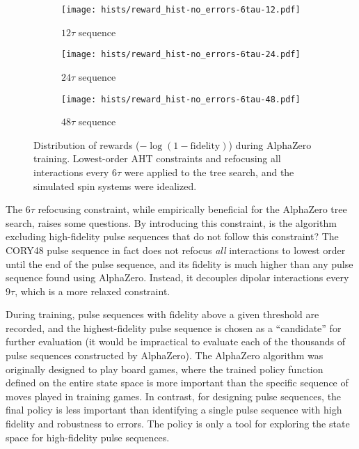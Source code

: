 \begin{figure}[H]
    \centering
    \begin{subfigure}{.49\textwidth}
        \centering
        \texttt{[image: hists/reward\_hist-no\_errors-6tau-12.pdf]}
        \caption{$12\tau$ sequence}
        \label{fig:reward_hist-no_errors-6tau-12}
    \end{subfigure}
    \begin{subfigure}{.49\textwidth}
        \centering
        \texttt{[image: hists/reward\_hist-no\_errors-6tau-24.pdf]}
        \caption{$24\tau$ sequence}
        \label{fig:reward_hist-no_errors-6tau-24}
    \end{subfigure}
    \begin{subfigure}{.49\textwidth}
        \centering
        \texttt{[image: hists/reward\_hist-no\_errors-6tau-48.pdf]}
        \caption{$48\tau$ sequence}
        \label{fig:reward_hist-no_errors-6tau-48}
    \end{subfigure}
    \caption{Distribution of rewards ($-\log(1 - \text{fidelity})$) during AlphaZero training. Lowest-order AHT constraints and refocusing all interactions every $6\tau$ were applied to the tree search, and the simulated spin systems were idealized.}
    \label{fig:reward_hist-no_errors-6tau}
\end{figure}

The $6\tau$ refocusing constraint, while empirically beneficial for the AlphaZero tree search, raises some questions. By introducing this constraint, is the algorithm excluding high-fidelity pulse sequences that do not follow this constraint? The CORY48 pulse sequence in fact does not refocus \emph{all} interactions to lowest order until the end of the pulse sequence, and its fidelity is much higher than any pulse sequence found using AlphaZero. Instead, it decouples dipolar interactions every $9\tau$, which is a more relaxed constraint.


During training, pulse sequences with fidelity above a given threshold are recorded, and the highest-fidelity pulse sequence is chosen as a ``candidate'' for further evaluation (it would be impractical to evaluate each of the thousands of pulse sequences constructed by AlphaZero).
The AlphaZero algorithm was originally designed to play board games, where the trained policy function defined on the entire state space is more important than the specific sequence of moves played in training games. In contrast, for designing pulse sequences, the final policy is less important than identifying a single pulse sequence with high fidelity and robustness to errors. The policy is only a tool for exploring the state space for high-fidelity pulse sequences.



